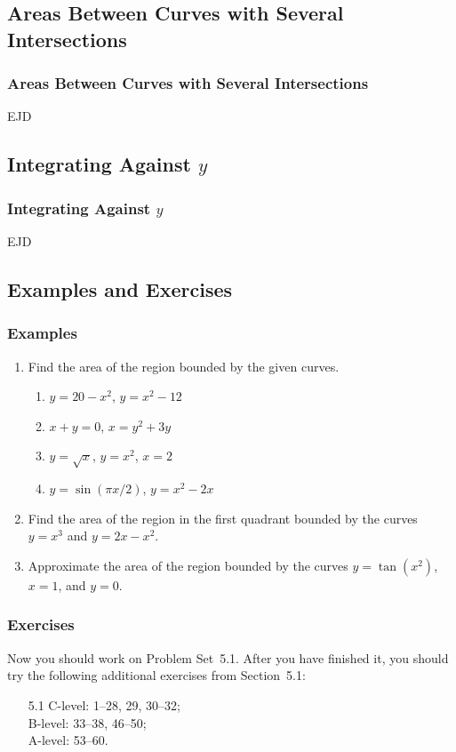 \documentclass[serif,ignorenonframetext]{beamer}
\begin{document}
\subsection{Areas Between Curves with Several Intersections}

\begin{frame}
  \frametitle{Areas Between Curves with Several Intersections}
  EJD
\end{frame}


\subsection{Integrating Against \(y\)}

\begin{frame}
  \frametitle{Integrating Against \(y\)}
  EJD
\end{frame}


\subsection{Examples and Exercises}

\begin{frame}
  \frametitle{Examples}
  \begin{enumerate}
  \item Find the area of the region bounded by the given curves.
    \begin{enumerate}
    \item $y=20-x^2$, $y=x^2-12$
    \item $x+y=0$, $x=y^2+3y$
    \item $y=\sqrt{x}$, $y=x^2$, $x=2$
    \item $y=\sin(\pi x/2)$, $y=x^2-2x$
    \end{enumerate}
  \item Find the area of the region in the first quadrant bounded by the
    curves $y=x^3$ and $y=2x-x^2$.
  \item Approximate the area of the region bounded by the curves $y=\tan(x^2)$,
    $x=1$, and $y=0$.
  \end{enumerate} 
\end{frame}

\begin{frame}
  \frametitle{Exercises}
  Now you should work on Problem Set~5.1.  After you have finished it,
  you should try the following additional exercises from Section~5.1:
  \begin{itemize}
  \item[5.1]
    C-level: 1--28, 29, 30--32; \\
    B-level: 33--38, 46--50; \\
    A-level: 53--60.
  \end{itemize}
\end{frame}
\end{document}
